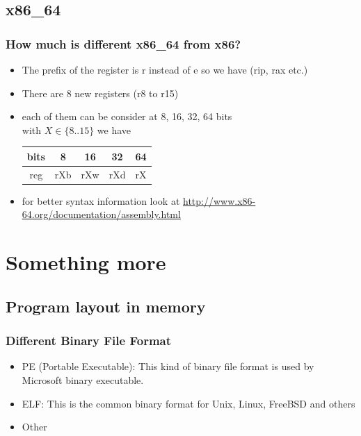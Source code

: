 \documentclass[]{beamer}
\newenvironment{changemargin}[2]{%
  \begin{list}{}{%
    \setlength{\topsep}{0pt}%
    \setlength{\leftmargin}{#1}%
    \setlength{\rightmargin}{#2}%
    \setlength{\listparindent}{\parindent}%
    \setlength{\itemindent}{\parindent}%
    \setlength{\parsep}{\parskip}%
  }%
  \item[]}{\end{list}}
\begin{document}
	\subsection{x86\_64}
		\begin{frame}
			\frametitle{How much is different x86\_64 from x86?}
			\begin{changemargin}{-0.7cm}{0cm}
			\begin{itemize}
				\item{The prefix of  the register is r instead of e so we have (rip, rax etc.)}
				\item{There are 8 new registers (r8 to r15)}
				\item{each of them can be consider at 8, 16, 32, 64 bits\\
				   with $X \in \{8..15\}$ we have }
				\begin{table}[h]
					\begin{tabular}{|c!{\vrule width 1pt }c|c|c|c|}
					\hline
					bits&8&16&32&64\\
					\hline
					reg&rXb&rXw&rXd&rX\\
					\hline	
					\end{tabular}
				\end{table}
				\item{for better syntax information look at \url{http://www.x86-64.org/documentation/assembly.html}}
			\end{itemize}
			\end{changemargin}
		\end{frame}
\section{Something more}
	\subsection{Program layout in memory}
		\begin{frame}
			\frametitle{Different Binary File Format}
				\begin{itemize}
					\item{\color{red}PE (Portable Executable)\color{black}: This kind of binary file format is used by Microsoft binary executable.}
					\item{\color{red}ELF\color{black}: This is the common binary format for Unix, Linux, FreeBSD and others}
					\item{\color{red}Other\color{black}}
				\end{itemize}
		\end{frame}
	
\end{document}
